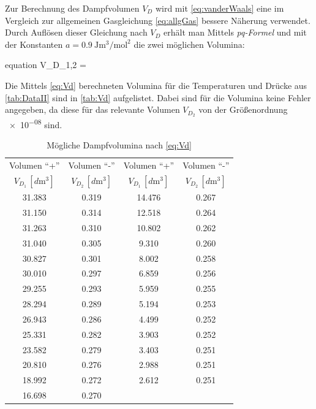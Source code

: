 	Zur Berechnung des Dampfvolumen $V_{D}$ wird mit \eqref{eq:vanderWaals} eine im Vergleich zur allgemeinen Gasgleichung
	\eqref{eq:allgGas} bessere Näherung verwendet. Durch Auflösen dieser Gleichung nach $V_{D}$ erhält man Mittels \emph{pq-Formel} 
	und mit der Konstanten 
	$ a = \SI{0.9}{\joule\cubic\meter\per\mole\squared}$ \cite{V203} 
	die zwei möglichen Volumina:
	\begin{empheq}{equation}
		V_{D_{1,2}} =  \pm {}
		\label{eq:Vd}
	\end{empheq} 
	Die Mittels \eqref{eq:Vd} berechneten Volumina für die Temperaturen und Drücke aus \autoref{tab:DataII} sind in \autoref{tab:Vd}
	aufgelistet. Dabei sind für die Volumina keine Fehler angegeben, da diese für das relevante Volumen $V_{D_{2}}$ von der Größenordnung
	\num{e-08} sind.
	
	\begin{table}[!h]
		\centering
		\begin{tabular}{|c|c||c|c|}
			\hline
			Volumen \enquote{+} & Volumen \enquote{-} & Volumen \enquote{+} & Volumen \enquote{-}\\
			$V_{D_{1}}\,[\si{d\meter\cubed}]$  & $V_{D_{2}}\,[\si{d\meter\cubed}]$ & $V_{D_{1}}\,[\si{d\meter\cubed}]$  & $V_{D_{2}}\,[\si{d\meter\cubed}]$ \\ \hline\hline
			\num{31.383}  & \num{0.319} & \num{14.476}  & \num{0.267} \\
			\num{31.150}  & \num{0.314} &\num{12.518}  & \num{0.264} \\
			\num{31.263}  & \num{0.310} &\num{10.802}  & \num{0.262} \\
			\num{31.040}  & \num{0.305} &\num{9.310}  & \num{0.260} \\
			\num{30.827}  & \num{0.301} &\num{8.002}  & \num{0.258} \\
			\num{30.010}  & \num{0.297} &\num{6.859}  & \num{0.256} \\
			\num{29.255}  & \num{0.293} &\num{5.959}  & \num{0.255} \\
			\num{28.294}  & \num{0.289} &\num{5.194}  & \num{0.253} \\
			\num{26.943}  & \num{0.286} &\num{4.499}  & \num{0.252} \\
			\num{25.331}  & \num{0.282} &\num{3.903}  & \num{0.252} \\
			\num{23.582}  & \num{0.279} &\num{3.403}  & \num{0.251} \\
			\num{20.810}  & \num{0.276} &\num{2.988}  & \num{0.251} \\
			\num{18.992}  & \num{0.272} &\num{2.612}  & \num{0.251} \\
			\num{16.698}  & \num{0.270} & & \\
			\hline
		\end{tabular}
		\caption{Mögliche Dampfvolumina nach \eqref{eq:Vd} \label{tab:Vd}}
	\end{table}
	
